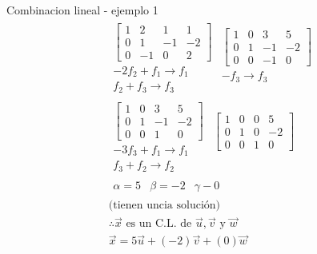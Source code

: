 \begin{Example*} {Combinacion lineal - ejemplo 1}
\begin{align*}
		&\begin{array}{c}
			\left[\begin{array}{ccc|c}
				1&2&1&1\\
				0&1&-1&-2\\
				0&-1&0&2
			\end{array}\right]\\
			-2f_2+f_1\rightarrow f_1\\
			f_2+f_3\rightarrow f_3
		\end{array}\begin{array}{c}
			\left[\begin{array}{ccc|c}
				1&0&3&5\\
				0&1&-1&-2\\
				0&0&-1&0
			\end{array}\right]\\
			-f_3\rightarrow f_3\\ \
		\end{array}\\
		&\begin{array}{c}
			\left[\begin{array}{ccc|c}
				1&0&3&5\\
				0&1&-1&-2\\
				0&0&1&0
			\end{array}\right]\\
			-3f_3+f_1\rightarrow f_1\\
			f_3+f_2\rightarrow f_2
		\end{array}\begin{array}{c}
			\left[\begin{array}{ccc|c}
				1&0&0&5\\
				0&1&0&-2\\
				0&0&1&0
			\end{array}\right]\\
				\ \\ \
		\end{array}\\
		&\begin{matrix}
			\alpha=5&\beta=-2&\gamma-0
		\end{matrix}\\
		&\text{(tienen uncia solución)}\\
		&\therefore \vec{x} \text{ es un C.L. de } \vec{u}, \vec{v} \text{ y } \vec{w}\\
		&\vec{x}=5\vec{u}+(-2)\vec{v}+(0)\vec{w}\\
	\end{align*}
\end{Example*}